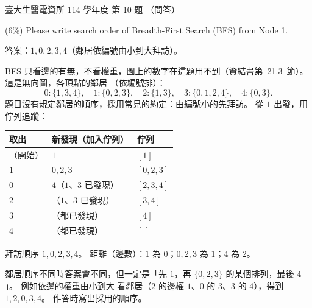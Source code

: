 \begin{pastexam}[label={px:ntu-114-bmei-ca-05}]{臺大生醫電資所 114 學年度 第 10 題}
（問答）

(6\%) Please write search order of Breadth-First Search (BFS) from Node 1.
\begin{center}
\end{center}
\end{pastexam}

\begin{pastsoln}
答案：$1, 0, 2, 3, 4$（鄰居依編號由小到大拜訪）。

BFS 只看邊的有無，不看權重，圖上的數字在這題用不到（資結書第~21.3~節）。 這是無向圖，各頂點的鄰居
（依編號排）：
\[
0: \{1, 3, 4\},\quad 1: \{0, 2, 3\},\quad 2: \{1, 3\},\quad 3: \{0, 1, 2, 4\},\quad 4: \{0, 3\}.
\]
題目沒有規定鄰居的順序，採用常見的約定：由編號小的先拜訪。 從 $1$ 出發，用佇列追蹤：
\begin{center}
\begin{tabular}{lll}
\toprule
取出 & 新發現（加入佇列） & 佇列 \\
\midrule
（開始） & $1$ & $[1]$ \\
$1$ & $0, 2, 3$ & $[0, 2, 3]$ \\
$0$ & $4$（$1$、$3$ 已發現） & $[2, 3, 4]$ \\
$2$ & （$1$、$3$ 已發現） & $[3, 4]$ \\
$3$ & （都已發現） & $[4]$ \\
$4$ & （都已發現） & $[\,]$ \\
\bottomrule
\end{tabular}
\end{center}
拜訪順序 $1, 0, 2, 3, 4$。 距離（邊數）：$1$ 為 $0$；$0, 2, 3$ 為 $1$；$4$ 為 $2$。

鄰居順序不同時答案會不同，但一定是「先 $1$，再 $\{0, 2, 3\}$ 的某個排列，最後 $4$」。 例如依邊的權重由小到大
看鄰居（$2$ 的邊權 $1$、$0$ 的 $3$、$3$ 的 $4$），得到 $1, 2, 0, 3, 4$。 作答時寫出採用的順序。
\end{pastsoln}
